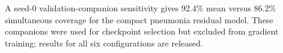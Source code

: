 A seed-0 validation-companion sensitivity gives 92.4\% mean versus 86.2\% simultaneous coverage for the compact pneumonia residual model. These companions were used for checkpoint selection but excluded from gradient training; results for all six configurations are released.